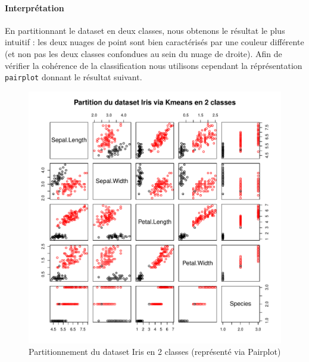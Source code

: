 \documentclass{report}
\begin{document}
\paragraph{Interprétation}
En partitionnant le dataset en deux classes, nous obtenons le résultat le plus intuitif : les deux nuages de point sont bien caractérisés par une couleur différente (et non pas les deux classes confondues au sein du nuage de droite). Afin de vérifier la cohérence de la classification nous utilisons cependant la réprésentation \verb+pairplot+ donnant le résultat suivant.
\begin{figure}[ht!]
\begin{center}
    \includegraphics[width=\textwidth]{../plots/E3Q1_ki2_2.pdf}
    \caption{Partitionnement du dataset Iris en 2 classes (représenté via Pairplot)}
\end{center}
\end{figure}
\newpage
\end{document}
